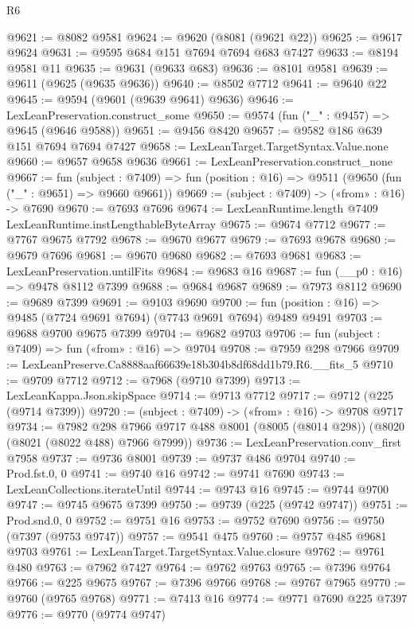 \begin{lexlean}{R6}
\begin{coremodule}
@9621 := @8082 @9581
@9624 := @9620 (@8081 (@9621 @22))
@9625 := @9617 @9624
@9631 := @9595 @684 @151 @7694 @7694 @683 @7427
@9633 := @8194 @9581 @11
@9635 := @9631 (@9633 @683)
@9636 := @8101 @9581
@9639 := @9611 (@9625 (@9635 @9636))
@9640 := @8502 @7712
@9641 := @9640 @22
@9645 := @9594 (@9601 (@9639 @9641) @9636)
@9646 := LexLeanPreservation.construct_some
@9650 := @9574 (fun ("_" : @9457) => @9645 (@9646 @9588))
@9651 := @9456 @8420
@9657 := @9582 @186 @639 @151 @7694 @7694 @7427
@9658 := LexLeanTarget.TargetSyntax.Value.none
@9660 := @9657 @9658 @9636
@9661 := LexLeanPreservation.construct_none
@9667 := fun (subject : @7409) =>
  fun (position : @16) => @9511 (@9650 (fun ("_" : @9651) => @9660 @9661))
@9669 := (subject : @7409) -> («from» : @16) -> @7690
@9670 := @7693 @7696
@9674 := LexLeanRuntime.length @7409 LexLeanRuntime.instLengthableByteArray
@9675 := @9674 @7712
@9677 := @7767 @9675 @7792
@9678 := @9670 @9677
@9679 := @7693 @9678
@9680 := @9679 @7696
@9681 := @9670 @9680
@9682 := @7693 @9681
@9683 := LexLeanPreservation.untilFits
@9684 := @9683 @16
@9687 := fun (__p0 : @16) => @9478 @8112 @7399
@9688 := @9684 @9687
@9689 := @7973 @8112
@9690 := @9689 @7399
@9691 := @9103 @9690
@9700 := fun (position : @16) => @9485 (@7724 @9691 @7694) (@7743 @9691 @7694) @9489 @9491
@9703 := @9688 @9700 @9675 @7399
@9704 := @9682 @9703
@9706 := fun (subject : @7409) => fun («from» : @16) => @9704
@9708 := @7959 @298 @7966
@9709 := LexLeanPreserve.Ca8888aaf66639e18b304b8df68dd1b79.R6.__fits_5
@9710 := @9709 @7712
@9712 := @7968 (@9710 @7399)
@9713 := LexLeanKappa.Json.skipSpace
@9714 := @9713 @7712
@9717 := @9712 (@225 (@9714 @7399))
@9720 := (subject : @7409) -> («from» : @16) -> @9708 @9717
@9734 := @7982
    @298
    @7966
    @9717
    @488
    @8001
    (@8005 (@8014 @298))
    (@8020 (@8021 (@8022 @488) @7966 @7999))
@9736 := LexLeanPreservation.conv_first @7958
@9737 := @9736 @8001
@9739 := @9737 @486 @9704
@9740 := Prod.fst.{0, 0}
@9741 := @9740 @16
@9742 := @9741 @7690
@9743 := LexLeanCollections.iterateUntil
@9744 := @9743 @16
@9745 := @9744 @9700
@9747 := @9745 @9675 @7399
@9750 := @9739 (@225 (@9742 @9747))
@9751 := Prod.snd.{0, 0}
@9752 := @9751 @16
@9753 := @9752 @7690
@9756 := @9750 (@7397 (@9753 @9747))
@9757 := @9541 @475
@9760 := @9757 @485 @9681 @9703
@9761 := LexLeanTarget.TargetSyntax.Value.closure
@9762 := @9761 @480
@9763 := @7962 @7427
@9764 := @9762 @9763
@9765 := @7396 @9764
@9766 := @225 @9675
@9767 := @7396 @9766
@9768 := @9767 @7965
@9770 := @9760 (@9765 @9768)
@9771 := @7413 @16
@9774 := @9771 @7690 @225 @7397
@9776 := @9770 (@9774 @9747)

\end{coremodule}
\end{lexlean}
